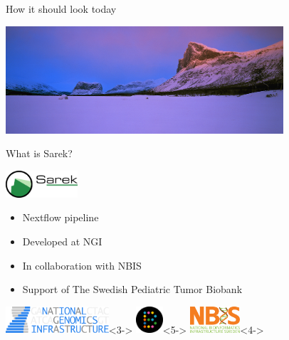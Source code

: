 \documentclass{beamer}
\begin{document}
\begin{frame}{How it should look today}
	\begin{center}
		\includegraphics[height=4cm]{pictures/Skierfe-winter.jpg}
	\end{center}
\end{frame}

\begin{frame}{What is Sarek?}
	\vfill
	\begin{center}
		\includegraphics[height=1cm]{pictures/Sarek_no_border}
	\end{center}
	\begin{itemize}
		\pause
		\item Nextflow pipeline
		\item<3-> Developed at NGI
		\item<4-> In collaboration with NBIS
		\item<5-> Support of The Swedish Pediatric Tumor Biobank
	\end{itemize}
	\begin{center}
		\includegraphics[height=1cm]{pictures/NGI}<3->
		\only<3->{\hfill}
		\includegraphics[height=1cm]{pictures/Barntumorbanken}<5->
		\only<4->{\hfill}
		\includegraphics[height=1cm]{pictures/NBIS}<4->
	\end{center}
	\vfill
\end{frame}
\end{document}
